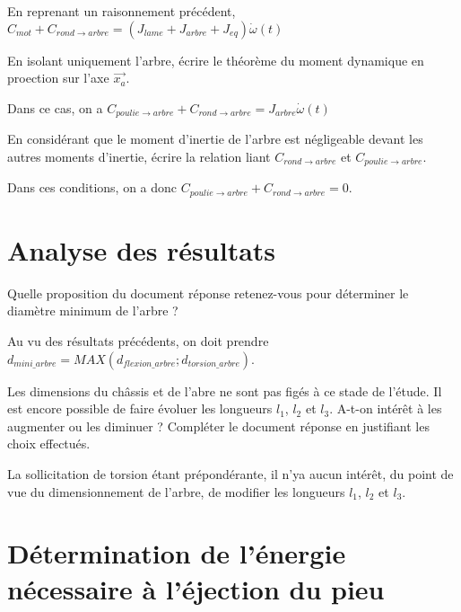 \documentclass[11pt]{article}
\begin{document}
\begin{UPSTIcorrige}
En reprenant un raisonnement précédent, 
$  C_{mot}+C_{rond\rightarrow arbre} = \left(J_{lame}+J_{arbre}+J_{eq}\right) \dot{\omega}(t)$
\end{UPSTIcorrige}

\UPSTIquestion En isolant uniquement l'arbre, écrire le théorème du moment dynamique en proection sur l'axe $\overrightarrow{x_a}$.
\begin{UPSTIcorrige}
Dans ce cas, on a 
$  C_{poulie \rightarrow arbre}+C_{rond\rightarrow arbre} = J_{arbre} \dot{\omega}(t)$
\end{UPSTIcorrige}

\UPSTIquestion En considérant que le moment d'inertie de l'arbre est négligeable devant les autres moments d'inertie, écrire la relation liant $C_{rond\rightarrow arbre}$ et $C_{poulie\rightarrow arbre}$.

\begin{UPSTIcorrige}
Dans ces conditions, on a donc $  C_{poulie \rightarrow arbre}+C_{rond\rightarrow arbre} =0$.
\end{UPSTIcorrige}

\section{Analyse des résultats}

\UPSTIquestion* Quelle proposition du document réponse retenez-vous pour déterminer le diamètre minimum de l'arbre ?

\begin{UPSTIcorrige}
Au vu des résultats précédents, on doit prendre $d_{mini\_arbre}=MAX\left(d_{flexion\_arbre};d_{torsion\_arbre}\right)$.
\end{UPSTIcorrige}

\UPSTIquestion Les dimensions du châssis et de l'abre ne sont pas figés à ce stade de l'étude. Il est encore possible de faire évoluer les longueurs $l_1$, $l_2$ et $l_3$. A-t-on intérêt à les augmenter ou les diminuer ? Compléter le document réponse en justifiant les choix effectués. 

\begin{UPSTIcorrige}
La sollicitation de torsion étant prépondérante, il n'ya aucun intérêt, du point de vue du dimensionnement de l'arbre, de modifier les longueurs $l_1$, $l_2$ et $l_3$.
\end{UPSTIcorrige}


\section{Détermination de l'énergie nécessaire à l'éjection du pieu}
\end{document}
